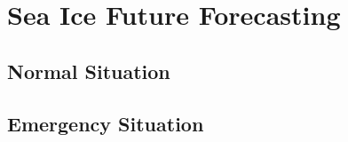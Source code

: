 \section{Sea Ice Future Forecasting} %

\subsection{Normal Situation} %




\subsection{Emergency Situation} %